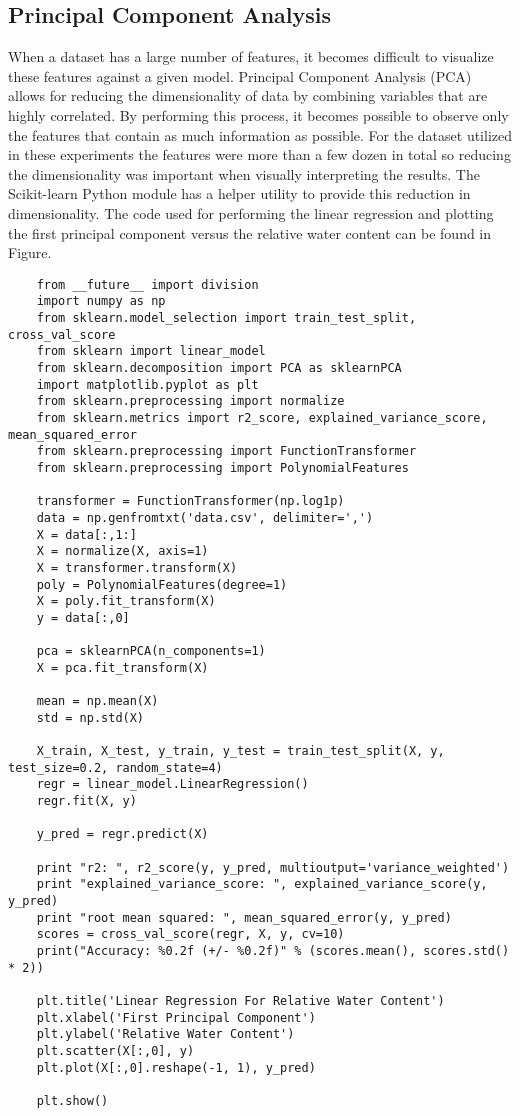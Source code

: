 \subsection{Principal Component Analysis}
When a dataset has a large number of features, it becomes difficult to visualize these features against a given model.  Principal Component Analysis (PCA) allows for reducing the dimensionality of data by combining variables that are highly correlated. By performing this process, it becomes possible to observe only the features that contain as much information as possible.  For the dataset utilized in these experiments the features were more than a few dozen in total so reducing the dimensionality was important when visually interpreting the results. The Scikit-learn Python module has a helper utility to provide this reduction in dimensionality.  The code used for performing the linear regression and plotting the first principal component versus the relative water content can be found in Figure.
\newpage
\begin{lstlisting}
    from __future__ import division
    import numpy as np
    from sklearn.model_selection import train_test_split, cross_val_score
    from sklearn import linear_model
    from sklearn.decomposition import PCA as sklearnPCA
    import matplotlib.pyplot as plt
    from sklearn.preprocessing import normalize
    from sklearn.metrics import r2_score, explained_variance_score, mean_squared_error
    from sklearn.preprocessing import FunctionTransformer
    from sklearn.preprocessing import PolynomialFeatures

    transformer = FunctionTransformer(np.log1p)
    data = np.genfromtxt('data.csv', delimiter=',')
    X = data[:,1:]
    X = normalize(X, axis=1)
    X = transformer.transform(X)
    poly = PolynomialFeatures(degree=1)
    X = poly.fit_transform(X)
    y = data[:,0]

    pca = sklearnPCA(n_components=1)
    X = pca.fit_transform(X)

    mean = np.mean(X)
    std = np.std(X)

    X_train, X_test, y_train, y_test = train_test_split(X, y, test_size=0.2, random_state=4)
    regr = linear_model.LinearRegression()
    regr.fit(X, y)

    y_pred = regr.predict(X)

    print "r2: ", r2_score(y, y_pred, multioutput='variance_weighted')
    print "explained_variance_score: ", explained_variance_score(y, y_pred)
    print "root mean squared: ", mean_squared_error(y, y_pred)
    scores = cross_val_score(regr, X, y, cv=10)
    print("Accuracy: %0.2f (+/- %0.2f)" % (scores.mean(), scores.std() * 2))

    plt.title('Linear Regression For Relative Water Content')
    plt.xlabel('First Principal Component')
    plt.ylabel('Relative Water Content')
    plt.scatter(X[:,0], y)
    plt.plot(X[:,0].reshape(-1, 1), y_pred)

    plt.show()
\end{lstlisting}
